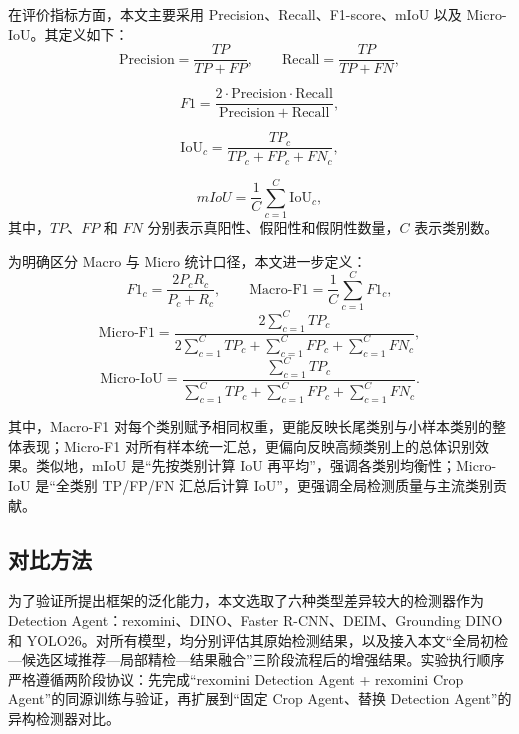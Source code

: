 在评价指标方面，本文主要采用 Precision、Recall、F1-score、mIoU 以及 Micro-IoU。其定义如下：
\begin{equation}
\mathrm{Precision}=\frac{TP}{TP+FP},
\qquad
\mathrm{Recall}=\frac{TP}{TP+FN},
\label{eq:precision_recall_exp}
\end{equation}

\begin{equation}
F1=\frac{2\cdot \mathrm{Precision}\cdot \mathrm{Recall}}
{\mathrm{Precision}+\mathrm{Recall}},
\label{eq:f1_exp}
\end{equation}

\begin{equation}
\mathrm{IoU}_c=\frac{TP_c}{TP_c+FP_c+FN_c},
\label{eq:iou_exp}
\end{equation}

\begin{equation}
mIoU=\frac{1}{C}\sum_{c=1}^{C}\mathrm{IoU}_c,
\label{eq:miou_exp}
\end{equation}
其中，$TP$、$FP$ 和 $FN$ 分别表示真阳性、假阳性和假阴性数量，$C$ 表示类别数。

为明确区分 Macro 与 Micro 统计口径，本文进一步定义：
\begin{equation}
F1_c=\frac{2P_cR_c}{P_c+R_c},\qquad
\mathrm{Macro\text{-}F1}=\frac{1}{C}\sum_{c=1}^{C}F1_c,
\label{eq:macro_f1_exp}
\end{equation}
\begin{equation}
\mathrm{Micro\text{-}F1}
=\frac{2\sum_{c=1}^{C}TP_c}
{2\sum_{c=1}^{C}TP_c+\sum_{c=1}^{C}FP_c+\sum_{c=1}^{C}FN_c},
\label{eq:micro_f1_exp}
\end{equation}
\begin{equation}
\mathrm{Micro\text{-}IoU}
=\frac{\sum_{c=1}^{C}TP_c}
{\sum_{c=1}^{C}TP_c+\sum_{c=1}^{C}FP_c+\sum_{c=1}^{C}FN_c}.
\label{eq:micro_iou_exp}
\end{equation}

其中，Macro-F1 对每个类别赋予相同权重，更能反映长尾类别与小样本类别的整体表现；Micro-F1 对所有样本统一汇总，更偏向反映高频类别上的总体识别效果。类似地，mIoU 是“先按类别计算 IoU 再平均”，强调各类别均衡性；Micro-IoU 是“全类别 TP/FP/FN 汇总后计算 IoU”，更强调全局检测质量与主流类别贡献。

\subsection{对比方法}
\label{subsec:compared_methods}

为了验证所提出框架的泛化能力，本文选取了六种类型差异较大的检测器作为 Detection Agent：rexomini\cite{rexomni2025}、DINO\cite{zhang2022dino}、Faster R-CNN\cite{ren2015faster}、DEIM\cite{huang2025deim}、Grounding DINO\cite{liu2024grounding} 和 YOLO26\cite{ultralytics2026yolo26}。对所有模型，均分别评估其原始检测结果，以及接入本文“全局初检—候选区域推荐—局部精检—结果融合”三阶段流程后的增强结果。实验执行顺序严格遵循两阶段协议：先完成“rexomini Detection Agent + rexomini Crop Agent”的同源训练与验证，再扩展到“固定 Crop Agent、替换 Detection Agent”的异构检测器对比。

